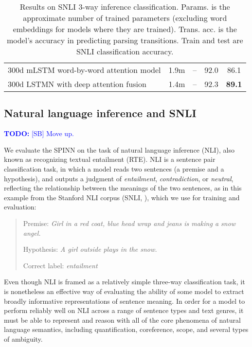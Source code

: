 \documentclass[11pt]{article}
\newcommand\todo[1]{\textcolor{blue}{\textbf{TODO:} #1}}
\begin{document}
\begin{table*}[t]
\begin{tabular}{lcccc}
300d mLSTM word-by-word attention model \citep{DBLP:journals/corr/WangJ15b}
                        & 1.9m               & --             &   92.0   &   86.1      \\
300d LSTMN with deep attention fusion \citep{cheng2016long}
                        & 1.4m               & --                &   92.3   &   \textbf{89.1}      \\
    \bottomrule
  \end{tabular}
\caption{\protect\label{tab:results}Results on SNLI 3-way inference classification. Params. is the approximate number of trained parameters (excluding word embeddings for models where they are trained). Trans. acc. is the model's accuracy in predicting parsing transitions. Train and test are SNLI classification accuracy.} 
\end{table*}


\subsection{Natural language inference and SNLI}
\todo{[SB] Move up.}

We evaluate the SPINN on the task of natural language inference (NLI), also known as recognizing textual entailment (RTE). NLI is a sentence pair classification task, in which a model reads two sentences (a premise and a hypothesis), and outputs a judgment of {\it entailment}, {\it contradiction}, or {\it neutral}, reflecting the relationship between the meanings of the two sentences, as in this example from the Stanford NLI corpus (SNLI, \citet{snli:emnlp2015}), which we use for training and evaluation: 

\begin{quote}
Premise: {\it Girl in a red coat, blue head wrap and jeans is making a snow angel.}

Hypothesis: {\it A girl outside plays in the snow.}

Correct label: {\it entailment}
\end{quote}

Even though NLI is framed as a relatively simple three-way classification task, it is nonetheless an effective way of evaluating the ability of some model to extract broadly informative representations of sentence meaning. In order for a model to perform reliably well on NLI across a range of sentence types and text genres, it must be able to represent and reason with all of the core phenomena of natural language semantics, including quantification, coreference, scope, and several types of ambiguity.
\end{document}
